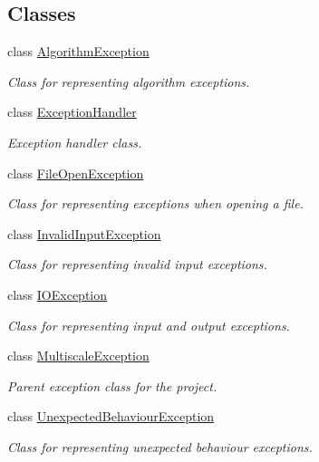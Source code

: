 \subsection*{\-Classes}
\begin{DoxyCompactItemize}
\item 
class \hyperlink{classmultiscale_1_1AlgorithmException}{\-Algorithm\-Exception}
\begin{DoxyCompactList}\small\item\em \-Class for representing algorithm exceptions. \end{DoxyCompactList}\item 
class \hyperlink{classmultiscale_1_1ExceptionHandler}{\-Exception\-Handler}
\begin{DoxyCompactList}\small\item\em \-Exception handler class. \end{DoxyCompactList}\item 
class \hyperlink{classmultiscale_1_1FileOpenException}{\-File\-Open\-Exception}
\begin{DoxyCompactList}\small\item\em \-Class for representing exceptions when opening a file. \end{DoxyCompactList}\item 
class \hyperlink{classmultiscale_1_1InvalidInputException}{\-Invalid\-Input\-Exception}
\begin{DoxyCompactList}\small\item\em \-Class for representing invalid input exceptions. \end{DoxyCompactList}\item 
class \hyperlink{classmultiscale_1_1IOException}{\-I\-O\-Exception}
\begin{DoxyCompactList}\small\item\em \-Class for representing input and output exceptions. \end{DoxyCompactList}\item 
class \hyperlink{classmultiscale_1_1MultiscaleException}{\-Multiscale\-Exception}
\begin{DoxyCompactList}\small\item\em \-Parent exception class for the project. \end{DoxyCompactList}\item 
class \hyperlink{classmultiscale_1_1UnexpectedBehaviourException}{\-Unexpected\-Behaviour\-Exception}
\begin{DoxyCompactList}\small\item\em \-Class for representing unexpected behaviour exceptions. \end{DoxyCompactList}\item 

\end{DoxyCompactItemize}
